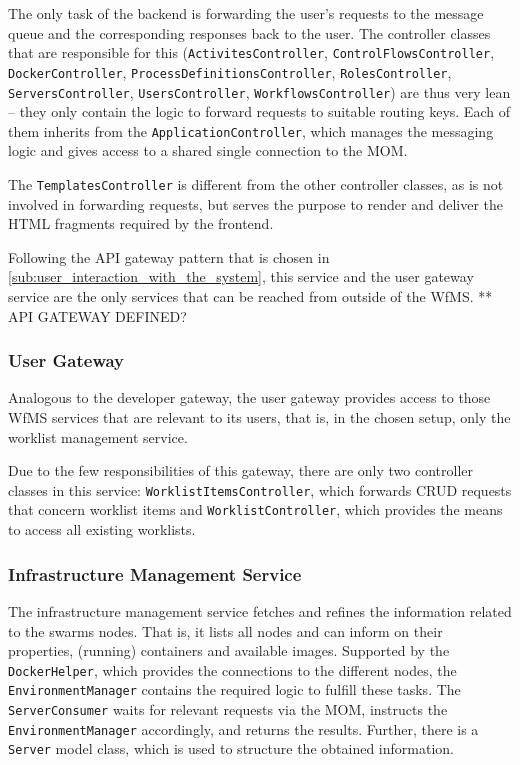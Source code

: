     The only task of the backend is forwarding the user's requests to the message queue and the corresponding responses back to the user. The controller classes that are responsible for this (\texttt{ActivitesController}, \texttt{ControlFlowsController}, \texttt{DockerController}, \texttt{ProcessDefinitionsController}, \texttt{RolesController}, \texttt{ServersController}, \texttt{UsersController}, \texttt{WorkflowsController}) are thus very lean -- they only contain the logic to forward requests to suitable routing keys. Each of them inherits from the \texttt{ApplicationController}, which manages the messaging logic and gives access to a shared single connection to the \ac{MOM}.

    The \texttt{TemplatesController} is different from the other controller classes, as is not involved in forwarding requests, but serves the purpose to render and deliver the \ac{HTML} fragments required by the frontend.

    Following the API gateway pattern that is chosen in \ref{sub:user_interaction_with_the_system}, this service and the user gateway service are the only services that can be reached from outside of the \ac{WfMS}.
    ** API GATEWAY DEFINED?


  \subsubsection{User Gateway} %
    \label{subs:user_gateway}
    Analogous to the developer gateway, the user gateway provides access to those \ac{WfMS} services that are relevant to its users, that is, in the chosen setup, only the worklist management service.

    Due to the few responsibilities of this gateway, there are only two controller classes in this service: \texttt{WorklistItemsController}, which forwards \ac{CRUD} requests that concern worklist items and \texttt{WorklistController}, which provides the means to access all existing worklists.

  \subsubsection{Infrastructure Management Service} %
    \label{subs:environment_management_service}
    The infrastructure management service fetches and refines the information related to the swarms nodes.
    That is, it lists all nodes and can inform on their properties, (running) containers and available images.
    Supported by the \texttt{DockerHelper}, which provides the connections to the different nodes, the \texttt{EnvironmentManager} contains the required logic to fulfill these tasks. The \texttt{ServerConsumer} waits for relevant requests via the \ac{MOM}, instructs the \texttt{EnvironmentManager} accordingly, and returns the results. Further, there is a \texttt{Server} model class, which is used to structure the obtained information.

